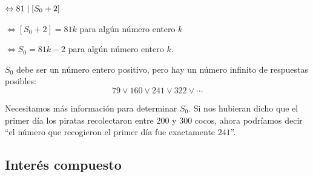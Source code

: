 $\Leftrightarrow 81\mid\left[S_0 + 2\right]$

$\Leftrightarrow\left[S_{0}+2\right]= 81k$ para algún número entero $k$

$\Leftrightarrow S_{0}=81k-2$ para algún número entero $k$.

$S_{0}$ debe ser un número entero positivo, pero hay un número infinito de respuestas posibles: \[ 79\vee160\vee241\vee322\vee\cdots \]

Necesitamos más información para determinar $S_0$. Si nos hubieran dicho que el primer día los piratas recolectaron entre $200$ y $300$ cocos, ahora podríamos decir ``el número que recogieron el primer día fue exactamente $241$''.

\subsection{Interés compuesto}

